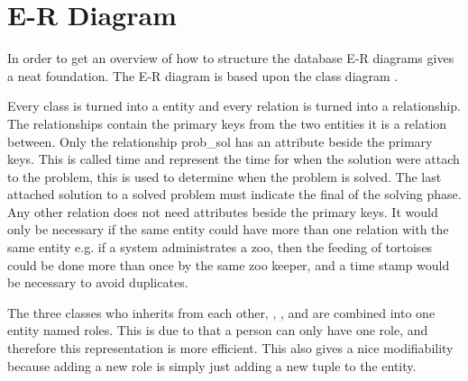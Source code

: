\newcommand{\erdiagram}[1][]{E-R diagram}
\section{E-R Diagram}
In order to get an overview of how to structure the database \erdiagram[]s gives a neat foundation. 
The \erdiagram[] is based upon the class diagram . 

Every class is turned into a entity and every relation is turned into a relationship. The relationships contain the primary keys from the two entities it is a relation between. Only the relationship prob\_sol has an attribute beside the primary keys. This is called time and represent the time for when the solution were attach to the problem, this is used to determine when the problem is solved. The last attached solution to a solved problem must indicate the final of the solving phase. Any other relation does not need attributes beside the primary keys. It would only be necessary if the same entity could have more than one relation with the same entity e.g. if a system administrates a zoo, then the feeding of tortoises could be done more than once by the same zoo keeper, and a time stamp would be necessary to avoid duplicates. 

The three classes who inherits from each other, \client[], \staff[], and \admin[] are combined into one entity named roles. This is due to that a person can only have one role, and therefore this representation is more efficient. This also gives a nice modifiability because adding a new role is simply just adding a new tuple to the entity. 